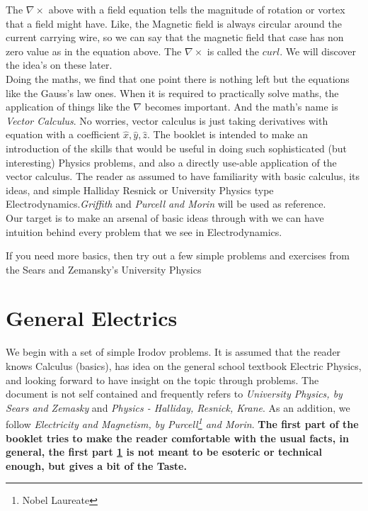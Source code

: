 \documentclass[11pt,a4paper,twocolumn,openright]{article}
\theoremstyle{definition}
\theoremstyle{definition}
\theoremstyle{definition}
\theoremstyle{definition}
\begin{document}
The $ \nabla \times$ above with a field equation tells the magnitude of rotation or vortex that a field might have. Like, the Magnetic field is always circular around the current carrying wire, so we can say that the magnetic field that case has non zero value as in the equation above. The $\nabla \times$ is called the $curl$. We will discover the idea's on these later. 
\\
Doing the maths, we find that one point there is nothing left but the equations like the Gauss's law ones. When it is required to practically solve maths, the application of things like the $\nabla$ becomes important. And the math's name is \emph{Vector Calculus}. No worries, vector calculus is just taking derivatives with equation with a coefficient $ \hat{x}, \hat{y}, \hat{z}$. The booklet is intended to make an introduction of the skills that would be useful in doing such sophisticated (but interesting) Physics problems, and also a directly use-able application of the vector calculus. The reader as assumed to have familiarity with basic calculus, its ideas, and simple Halliday Resnick or University Physics type Electrodynamics.\emph{Griffith} and \emph{Purcell and Morin} will be used as reference. \\
Our target is to make an arsenal of basic ideas through with we can have intuition behind every problem that we see in Electrodynamics.

If you need more basics, then try out a few simple problems and exercises from the Sears and Zemansky's University Physics

\section{\small{General Electrics}} \label{general electrics}

We begin with a set of simple Irodov problems. It is assumed that the reader knows Calculus (basics), has idea on the general school textbook Electric Physics, and looking forward to have insight on the topic through problems. The document is not self contained and frequently refers to \emph{University Physics, by Sears and Zemasky} and \emph{Physics - Halliday, Resnick, Krane}. As an addition, we follow \emph{Electricity and Magnetism, by Purcell\footnote{Nobel Laureate} and Morin}. \textbf{The first part of the booklet tries to make the reader comfortable with the usual facts, in general, the first part \ref{general electrics} is not meant to be esoteric or technical enough, but gives a bit of the Taste. }
\end{document}
